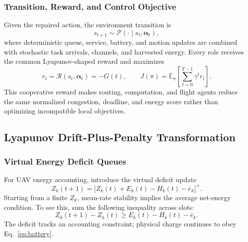 \documentclass[journal]{IEEEtran}
\begin{document}
\subsubsection{Transition, Reward, and Control Objective}
Given the repaired action, the environment transition is
\begin{equation}
s_{t+1}\sim\mathcal P(\cdot\mid s_t,\boldsymbol\alpha_t),
\label{eq:mdp_transition}
\end{equation}
where deterministic queue, service, battery, and motion updates are combined
with stochastic task arrivals, channels, and harvested energy.  Every role
receives the common Lyapunov-shaped reward and maximizes
\begin{equation}
r_t=\mathcal R(s_t,\boldsymbol\alpha_t)=-G(t),\qquad
J(\pi)=\mathbb E_{\pi}\!\left[\sum_{t=0}^{T-1}\gamma^t r_t\right].
\label{eq:mdp_reward}
\end{equation}
This cooperative reward makes routing, computation, and flight agents reduce
the same normalized congestion, deadline, and energy score rather than
optimizing incompatible local objectives.

\subsection{Lyapunov Drift-Plus-Penalty Transformation}
\subsubsection{Virtual Energy Deficit Queues}
For UAV energy accounting, introduce the virtual deficit update
\begin{equation}
Z_k(t+1)=\bigl[Z_k(t)+E_k(t)-H_k(t)-\bar e_k\bigr]^+.
\label{eq:virtual}
\end{equation}
Starting from a finite $Z_k$, mean-rate stability implies the average net-energy condition. To see this, sum the following inequality across slots:
\[
Z_k(t+1)-Z_k(t)\ge E_k(t)-H_k(t)-\bar e_k.
\]
The deficit tracks an accounting constraint; physical charge continues to obey Eq.~\eqref{eq:battery}.
\end{document}
